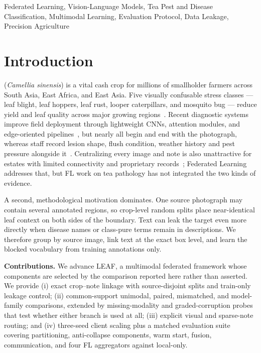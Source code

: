 \documentclass[conference]{IEEEtran}
\begin{document}
\begin{IEEEkeywords}
Federated Learning, Vision-Language Models, Tea Pest and Disease Classification,
Multimodal Learning, Evaluation Protocol, Data Leakage, Precision Agriculture
\end{IEEEkeywords}

\section{Introduction}

 (\textit{Camellia sinensis}) is a vital cash crop for
millions of smallholder farmers across South Asia, East Africa, and East Asia.
Five visually confusable stress classes --- leaf blight, leaf hoppers, leaf rust,
looper caterpillars, and mosquito bug --- reduce yield and leaf quality across
major growing regions~\cite{Yang2025WaveLite,Hu2024CropProtection}. Recent diagnostic systems
improve field deployment through lightweight CNNs, attention modules, and
edge-oriented pipelines~\cite{Yang2025WaveLite,Hu2024CropProtection,DengPhotong2024,Joseph2024IEEEAccess,Maurya2024IEEEAccess,AlShahari2025IEEEAccess},
but nearly all begin and end with the photograph, whereas staff record lesion
shape, flush condition, weather history and pest pressure alongside
it~\cite{Pandey2021TeaFungal,Sinniah2024TeaDiagnosis}. Centralizing every image and
note is also unattractive for estates with limited connectivity and proprietary
records~\cite{Dembani2025FLPrivacy,Puppala2025SelfReg}; Federated
Learning~\cite{McMahan2017} addresses that, but FL work on tea pathology has not
integrated the two kinds of evidence.

A second, methodological motivation dominates. One
source photograph may contain several annotated regions, so crop-level random
splits place near-identical leaf context on both sides of the boundary. Text can
leak the target even more directly when disease names or class-pure terms remain
in descriptions. We therefore group by source image, link text at the exact box
level, and learn the blocked vocabulary from training annotations only.

\textbf{Contributions.} We advance LEAF, a multimodal federated framework whose
components are selected by the comparison reported here rather than asserted. We
provide
(i) exact crop--note linkage with
source-disjoint splits and train-only leakage control; (ii) common-support
unimodal, paired, mismatched, and model-family comparisons, extended by
missing-modality and graded-corruption probes that test whether either branch is
used at all; (iii) explicit
visual and sparse-note routing; and (iv) three-seed client scaling plus a
matched evaluation suite covering partitioning, anti-collapse components, warm
start, fusion, communication, and four FL aggregators against local-only.
\end{document}
